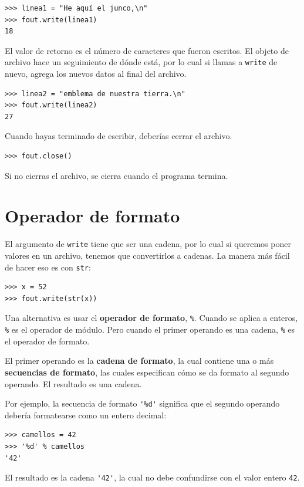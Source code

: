 \documentclass[10pt]{book}
\begin{document}
\begin{verbatim}
>>> linea1 = "He aquí el junco,\n"
>>> fout.write(linea1)
18
\end{verbatim}
%
El valor de retorno es el número de caracteres que fueron escritos.
El objeto de archivo hace un seguimiento de dónde está, por lo cual si
llamas a {\tt write} de nuevo, agrega los nuevos datos al final del
archivo.

\begin{verbatim}
>>> linea2 = "emblema de nuestra tierra.\n"
>>> fout.write(linea2)
27
\end{verbatim}
%
Cuando hayas terminado de escribir, deberías cerrar el archivo.

\begin{verbatim}
>>> fout.close()
\end{verbatim}
%
%
Si no cierras el archivo, se cierra cuando el
programa termina.


\section{Operador de formato}

El argumento de {\tt write} tiene que ser una cadena, por lo cual si queremos
poner valores en un archivo, tenemos que convertirlos a
cadenas.  La manera más fácil de hacer eso es con {\tt str}:

\begin{verbatim}
>>> x = 52
>>> fout.write(str(x))
\end{verbatim}
%
Una alternativa es usar el {\bf operador de formato}, {\tt \%}.  Cuando
se aplica a enteros, {\tt \%} es el operador de módulo.  Pero
cuando el primer operando es una cadena, {\tt \%} es el operador de formato.

El primer operando es la {\bf cadena de formato}, la cual contiene
una o más {\bf secuencias de formato}, las cuales
especifican cómo
se da formato al segundo operando.  El resultado es una cadena.

Por ejemplo, la secuencia de formato \verb"'%d'" significa que
el segundo operando debería formatearse como un entero
decimal:

\begin{verbatim}
>>> camellos = 42
>>> '%d' % camellos
'42'
\end{verbatim}
%
El resultado es la cadena \verb"'42'", la cual no debe confundirse
con el valor entero {\tt 42}.
\end{document}
